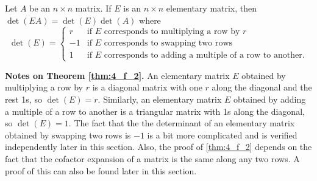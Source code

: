 \begin{theorem} \label{thm:4_f_2} Let $A$ be an $n\times n$ matrix. If $E$ is an $n\times n$ elementary matrix, then $\det(EA)=\det(E)\det(A)$ where
\[ \det(E) = \left\{ \begin{array}{rl} r & \text{if $E$ corresponds to multiplying a row by $r$} \\ -1& \text{if $E$ corresponds to swapping two rows} \\ 1 & \text{if $E$ corresponds to adding a multiple of a row to another.} \end{array} \right. \]
\end{theorem}



\noindent \textbf{Notes on Theorem \ref{thm:4_f_2}.} An elementary matrix $E$ obtained by multiplying a row by $r$ is a diagonal matrix with one $r$ along the diagonal and the rest 1s, so $\det(E) = r$. Similarly, an elementary matrix $E$ obtained by adding a multiple of a row to another is a triangular matrix with 1s along the diagonal, so $\det(E) = 1$. The fact that the the determinant of an elementary matrix obtained by swapping two rows is $-1$ is a bit more complicated and is verified independently later in this section. Also, the proof of \ref{thm:4_f_2} depends on the fact that the cofactor expansion of a matrix is the same along any two rows. A proof of this can also be found later in this section.



